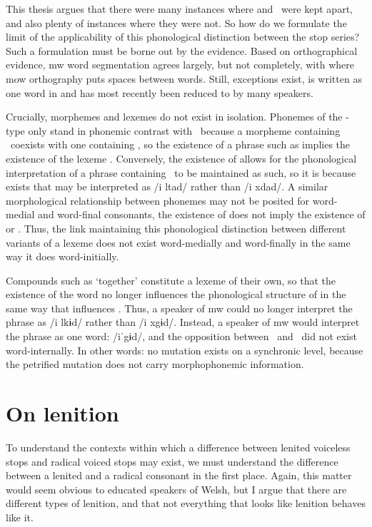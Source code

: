 This thesis argues that there were many instances where \lT
and \xD\ were kept apart, and also plenty of instances where they were not. 
So how do we formulate the limit of the applicability of this phonological distinction between the stop series?
Such a formulation must be borne out by the evidence. Based on orthographical evidence, \gls{mw} word segmentation agrees largely, but not completely, with where \gls{mow} orthography puts spaces between words.
Still, exceptions exist, \eg {} is written as  one word in  and has most recently been reduced to  by many speakers.

Crucially, morphemes and lexemes do not exist in isolation. 
Phonemes of the \lT -type only stand in phonemic contrast with \xD\ because a morpheme containing \lT\ coexists with one containing \xT, so the existence of a phrase such as  implies the existence of the lexeme .
Conversely, the existence of  allows for the phonological interpretation of a phrase containing \lT\ to be maintained as such, so it is because   exists that  may be interpreted as /i \gls{l}tad/ rather than /i \gls{x}dad/.
A similar morphological relationship between phonemes may not be posited for word-medial and word-final consonants, \eg the existence of  does not imply the existence of  or .
Thus, the link maintaining this phonological distinction between different variants of a lexeme does not exist word-medially and word-finally in the same way it does word-initially.

Compounds such as  `together' constitute a lexeme of their own, so that the existence of the word  no longer influences the phonological structure of  in the same way that  influences .  Thus, a speaker of \gls{mw} could no longer  interpret the phrase  as /i \gls{l}kɨd/ rather than /i \gls{x}gɨd/. Instead, a speaker of \gls{mw} would interpret the phrase as one word: /iˈgɨd/, and the opposition between \lT\ and \xD\ did not exist word-internally. In other words:  no mutation exists on a synchronic level, because the petrified mutation does not carry morphophonemic information.

\section{On lenition}
\label{sec:lenition}
To understand the contexts within which a difference between lenited voiceless stops and radical voiced stops may exist,
we must understand  the difference between a lenited and a radical consonant  in the first place. 
Again, this matter would seem obvious to educated speakers of Welsh, 
but I  argue that there are different types of lenition, 
and that not everything that looks like lenition behaves like it.

